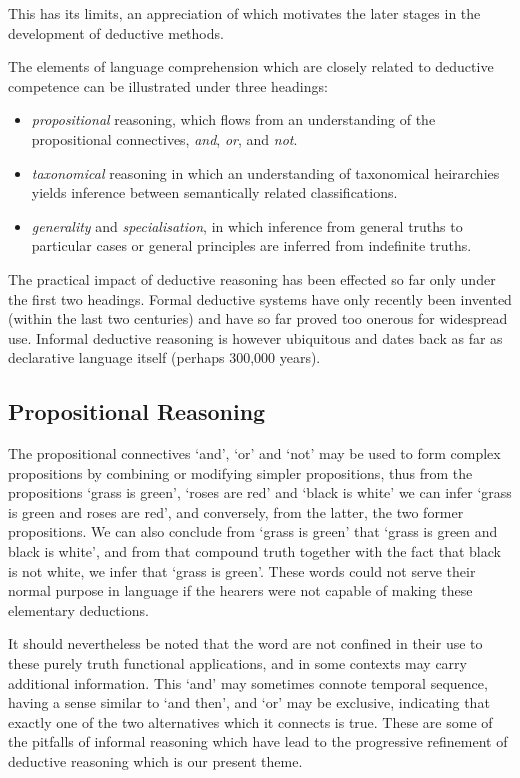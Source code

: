 \documentclass[10pt,titlepage]{book}
\begin{document}
This has its limits, an appreciation of which motivates the later stages in the development of deductive methods.

The elements of language comprehension which are closely related to deductive competence can be illustrated under three headings:
\begin{itemize}
\item \emph{propositional} reasoning, which flows from an understanding of the propositional connectives, \emph{and}, \emph{or}, and \emph{not}.
\item \emph{taxonomical} reasoning in which an understanding of taxonomical heirarchies yields inference between semantically related classifications.
\item \emph{generality} and \emph{specialisation}, in which inference from general truths to particular cases or general principles are inferred from indefinite truths.
\end{itemize}

The practical impact of deductive reasoning has been effected so far only under the first two headings.
Formal deductive systems have only recently been invented (within the last two centuries) and have so far proved too onerous for widespread use.
Informal deductive reasoning is however ubiquitous and dates back as far as declarative language itself (perhaps 300,000 years).

\subsection{Propositional Reasoning}

The propositional connectives `and', `or' and `not' may be used to form complex propositions by combining or modifying simpler propositions, thus from the propositions `grass is green', `roses are red' and `black is white' we can infer `grass is green and roses are red', and conversely, from the latter, the two former propositions.
We can also conclude from `grass is green' that `grass is green and black is white', and from that compound truth together with the fact that black is not white, we infer that `grass is green'.
These words could not serve their normal purpose in language if the hearers were not capable of making these elementary deductions.

It should nevertheless be noted that the word are not confined in their use to these purely truth functional applications, and in some contexts may carry additional information.
This `and' may sometimes connote temporal sequence, having a sense similar to `and then', and `or' may be exclusive, indicating that exactly one of the two alternatives which it connects is true.
These are some of the pitfalls of informal reasoning which have lead to the progressive refinement of deductive reasoning which is our present theme.
\end{document}
